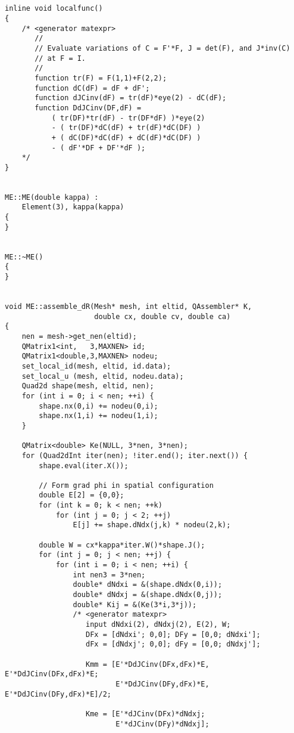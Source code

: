 \documentclass{article}
\begin{document}
\begin{verbatim}


inline void localfunc()
{
    /* <generator matexpr>
       //
       // Evaluate variations of C = F'*F, J = det(F), and J*inv(C)
       // at F = I.
       //
       function tr(F) = F(1,1)+F(2,2);
       function dC(dF) = dF + dF';
       function dJCinv(dF) = tr(dF)*eye(2) - dC(dF);
       function DdJCinv(DF,dF) =
           ( tr(DF)*tr(dF) - tr(DF*dF) )*eye(2)
           - ( tr(DF)*dC(dF) + tr(dF)*dC(DF) )
           + ( dC(DF)*dC(dF) + dC(dF)*dC(DF) )
           - ( dF'*DF + DF'*dF );
    */
}


ME::ME(double kappa) :
    Element(3), kappa(kappa)
{
}


ME::~ME()
{
}


void ME::assemble_dR(Mesh* mesh, int eltid, QAssembler* K,
                     double cx, double cv, double ca)
{
    nen = mesh->get_nen(eltid);
    QMatrix1<int,   3,MAXNEN> id;
    QMatrix1<double,3,MAXNEN> nodeu;
    set_local_id(mesh, eltid, id.data);
    set_local_u (mesh, eltid, nodeu.data);
    Quad2d shape(mesh, eltid, nen);
    for (int i = 0; i < nen; ++i) {
        shape.nx(0,i) += nodeu(0,i);
        shape.nx(1,i) += nodeu(1,i);
    }

    QMatrix<double> Ke(NULL, 3*nen, 3*nen);
    for (Quad2dInt iter(nen); !iter.end(); iter.next()) {
        shape.eval(iter.X());

        // Form grad phi in spatial configuration
        double E[2] = {0,0};
        for (int k = 0; k < nen; ++k)
            for (int j = 0; j < 2; ++j)
                E[j] += shape.dNdx(j,k) * nodeu(2,k);

        double W = cx*kappa*iter.W()*shape.J();
        for (int j = 0; j < nen; ++j) {
            for (int i = 0; i < nen; ++i) {
                int nen3 = 3*nen;
                double* dNdxi = &(shape.dNdx(0,i)); 
                double* dNdxj = &(shape.dNdx(0,j));
                double* Kij = &(Ke(3*i,3*j));
                /* <generator matexpr>
                   input dNdxi(2), dNdxj(2), E(2), W;
                   DFx = [dNdxi'; 0,0]; DFy = [0,0; dNdxi'];
                   dFx = [dNdxj'; 0,0]; dFy = [0,0; dNdxj'];

                   Kmm = [E'*DdJCinv(DFx,dFx)*E, E'*DdJCinv(DFx,dFx)*E;
                          E'*DdJCinv(DFy,dFx)*E, E'*DdJCinv(DFy,dFx)*E]/2;

                   Kme = [E'*dJCinv(DFx)*dNdxj;
                          E'*dJCinv(DFy)*dNdxj];


\end{verbatim}
\end{document}
